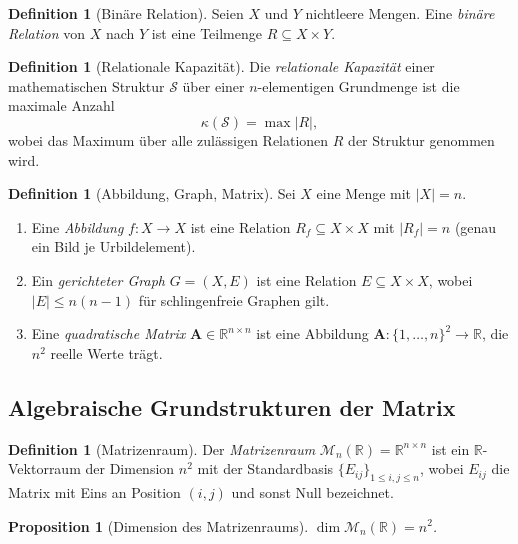 ﻿\documentclass[12pt, a4paper]{article}
\newtheorem{proposition}[theorem]{Proposition}
\theoremstyle{definition}
\newtheorem{definition}[theorem]{Definition}
\theoremstyle{remark}
\newcommand{\R}{\mathbb{R}}
\newcommand{\vA}{\bm{A}}
\begin{document}
\begin{definition}[Binäre Relation]
Seien $X$ und $Y$ nichtleere Mengen. Eine \emph{binäre Relation} von $X$
nach $Y$ ist eine Teilmenge $R \subseteq X \times Y$.
\end{definition}

\begin{definition}[Relationale Kapazität]
\label{def:rel_kap}
Die \emph{relationale Kapazität} einer mathematischen Struktur $\mathcal{S}$
über einer $n$-elementigen Grundmenge ist die maximale Anzahl
\[
  \kappa(\mathcal{S}) = \max\bigl|R\bigr|,
\]
wobei das Maximum über alle zulässigen Relationen $R$ der Struktur genommen wird.
\end{definition}

\begin{definition}[Abbildung, Graph, Matrix]
\label{def:drei}
Sei $X$ eine Menge mit $|X| = n$.
\begin{enumerate}[label=(\alph*)]
  \item Eine \emph{Abbildung} $f: X \to X$ ist eine Relation
    $R_f \subseteq X \times X$ mit $|R_f| = n$
    (genau ein Bild je Urbildelement).
  \item Ein \emph{gerichteter Graph} $G = (X, E)$ ist eine Relation
    $E \subseteq X \times X$, wobei $|E| \leq n(n-1)$ für schlingenfreie
    Graphen gilt.
  \item Eine \emph{quadratische Matrix} $\vA \in \R^{n \times n}$ ist eine
    Abbildung $\vA: \{1,\ldots,n\}^2 \to \R$, die $n^2$ reelle Werte
    trägt.
\end{enumerate}
\end{definition}

\subsection{Algebraische Grundstrukturen der Matrix}
\label{subsec:algebra}

\begin{definition}[Matrizenraum]
Der \emph{Matrizenraum} $\mathcal{M}_n(\R) = \R^{n \times n}$ ist ein
$\R$-Vektorraum der Dimension $n^2$ mit der Standardbasis
$\{E_{ij}\}_{1 \leq i,j \leq n}$, wobei $E_{ij}$ die Matrix mit Eins an
Position $(i,j)$ und sonst Null bezeichnet.
\end{definition}

\begin{proposition}[Dimension des Matrizenraums]
\label{prop:dim}
$\dim \mathcal{M}_n(\R) = n^2$.
\end{proposition}
\end{document}
